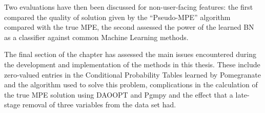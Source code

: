 Two evaluations have then been discussed for non-user-facing features: the first compared the quality of solution given by the \enquote{Pseudo-MPE} algorithm compared with the true MPE, the second assessed the power of the learned BN as a classifier against common Machine Learning methods.

The final section of the chapter has assessed the main issues encountered during the development and implementation of the methods in this thesis.
These include zero-valued entries in the Conditional Probability Tables learned by Pomegranate and the algorithm used to solve this problem, complications in the calculation of the true MPE solution using DAOOPT and Pgmpy and the effect that a late-stage removal of three variables from the data set had.
